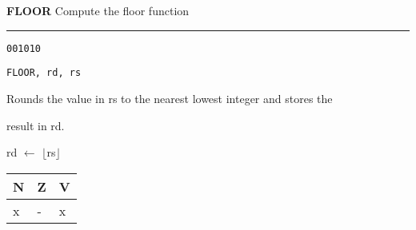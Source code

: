 \documentclass{article}
\begin{document}
\flushleft
\LARGE\textbf{FLOOR} \large \hfill Compute the floor function

\kern-3pt
\noindent\rule{16.5cm}{0.4pt}
\normalsize

{\large
	 \texttt{001010} \par
	\smallbreak
	 \texttt{FLOOR, rd, rs} \par
	\smallbreak
	 Rounds the value in rs to the nearest lowest integer and stores the \par
	\makebox[3.5cm][l]{  } result in rd. \par
	\smallbreak
	 rd $\leftarrow$ $\lfloor$rs$\rfloor$ \par
	\smallbreak
	 \begin{tabular}{lll} N \quad & Z \quad & V \\ \hline x & - & x \\ \end{tabular}
}
\end{document}
